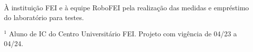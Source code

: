 \documentclass[a4paper,10pt,twocolumn,fleqn]{article}
\begin{document}
    
    
    

    \begin{agradecimentos}
    \justify À instituição FEI e à equipe RoboFEI pela realização das medidas e empréstimo do laboratório para testes.
    
    \bigskip %
    
    $^1$ Aluno de IC do Centro Universitário FEI. Projeto com vigência de 04/23 a 04/24.   
    \end{agradecimentos} 
     
    
\end{document}
